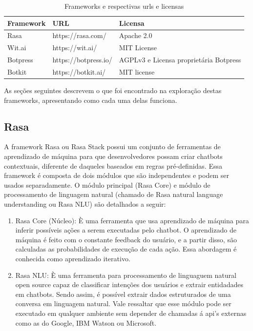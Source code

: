 \begin{table}[H]
    
    \begin{center}
    \begin{tabular}{| p{3cm}| p{3cm}|  p{3cm}|}
    \hline
     Framework & URL & Licensa\\
    \hline
    Rasa & https://rasa.com/ & Apache 2.0 \\
    \hline
    Wit.ai & https://wit.ai/ & MIT License \\
    \hline
    Botpress & https://botpress.io/ &  AGPLv3 e Licensa proprietária Botpress \\
    \hline
    Botkit & https://botkit.ai/ & MIT license \\
    \hline
    
    \end{tabular}
    \caption{ Frameworks e respectivas urls e licensas}
    
    \end{center}
   
\end{table}

As seções seguintes descrevem o que foi encontrado na exploração destas frameworks, apresentando como cada uma delas funciona.


\subsection{Rasa}

A framework Rasa ou Rasa Stack possui um conjunto de ferramentas de aprendizado de máquina para que desenvolvedores possam criar chatbots contextuais, diferente de daqueles baseados em regras pré-definidas. Essa framework é composta de dois módulos que são independentes e podem ser usados separadamente. O módulo principal (Rasa Core) e módulo de processamento de linguagem natural (chamado de Rasa natural language understanding ou Rasa NLU) são detalhados a seguir:

\begin{enumerate}
    \item Rasa Core (Núcleo): È uma ferramenta que usa aprendizado de máquina para inferir possíveis ações a serem executadas pelo chatbot. O aprendizado de máquina é feito com o constante feedback do usuário, e a partir disso, são calculadas as probabilidades de execução de cada ação. Essa abordagem é conhecida como aprendizado iterativo.
    \item Rasa NLU: È uma ferramenta para processamento de linguaguem natural open source capaz de classificar intenções dos usuários e extrair entidadades em chatbots. Sendo assim, é possível extrair dados estruturados de uma conversa em linguagem natural. Vale ressaltar que esse módulo pode ser executado em qualquer ambiente sem depender de chamadas á api's externas como as do Google, IBM Watson ou Microsoft.
    
\end{enumerate}

